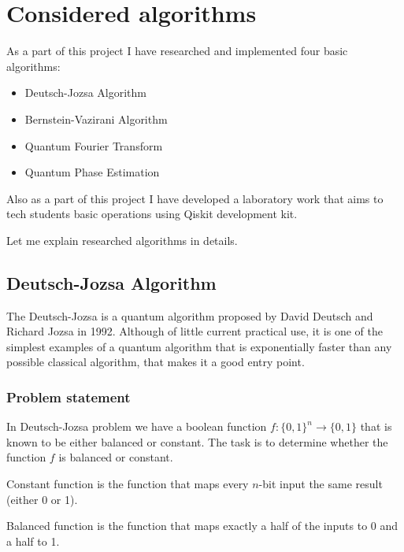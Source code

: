 
\chapter{Considered algorithms} %

\label{ch:considered-algorithms} %

As a part of this project I have researched and implemented four basic algorithms:
\begin{itemize}
    \item Deutsch-Jozsa Algorithm
    \item Bernstein-Vazirani Algorithm
    \item Quantum Fourier Transform
    \item Quantum Phase Estimation
\end{itemize}

Also as a part of this project I have developed a laboratory work that aims to tech students basic operations using Qiskit development kit.

Let me explain researched algorithms in details.


\section{Deutsch-Jozsa Algorithm}

The Deutsch-Jozsa is a quantum algorithm proposed by David Deutsch and Richard Jozsa in 1992\cite{DeutschJozsa}.
Although of little current practical use, it is one of the simplest examples of a quantum algorithm that is exponentially faster than any possible classical algorithm, that makes it a good entry point.

\subsection{Problem statement}

In Deutsch-Jozsa problem we have a boolean function $f : \{0, 1\}^n \rightarrow \{0, 1\}$ that is known to be either balanced or constant.
The task is to determine whether the function $f$ is balanced or constant.

Constant function is the function that maps every $n$-bit input the same result (either 0 or 1).

Balanced function is the function that maps exactly a half of the inputs to 0 and a half to 1.


